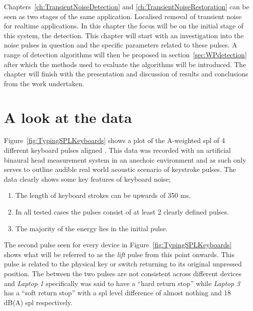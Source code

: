 Chapters~\ref{ch:TransientNoiseDetection} and \ref{ch:TransientNoiseRestoration} can be seen as two stages of the same application. Localised removal of transient noise for realtime applications. In this chapter the focus will be on the initial stage of this system, the detection. This chapter will start with an investigation into the noise pulses in question and the specific parameters related to these pulses. A range of detection algorithms will then be proposed in section~\ref{sec:WPdetection} after which the methods used to evaluate the algorithms will be introduced. The chapter will finish with the presentation and discussion of results and conclusions from the work undertaken.

\section{A look at the data}\label{sec:WPdata}
Figure~\ref{fig:TypingSPLKeyboards} shows a plot of the A-weighted \DIFdelbegin {}\DIFdelend \DIFaddbegin \gls{spl} \DIFaddend of 4 different keyboard pulses aligned \cite{Hauswirth2013}. This data was recorded with an artificial binaural head measurement system in an anechoic environment and as such only serves to outline \DIFaddbegin {}\DIFaddend audible real world acoustic scenario of keystroke pulses. The data clearly shows some key features of keyboard noise;
\begin{enumerate}
\item The length of keyboard strokes can be upwards of 350 ms.
\item In all tested cases the pulses consist of at least 2 clearly defined pulses.
\item The majority of the energy lies in the initial pulse.
\end{enumerate}

The second pulse seen for every device in Figure~\ref{fig:TypingSPLKeyboards} shows what will be referred to as the \emph{lift} pulse from this point onwards. This pulse is related to the physical key or switch returning to its original unpressed position. The \DIFdelbegin {}\DIFdelend \DIFaddbegin {}\DIFaddend between the two pulses are not consistent across different devices and \emph{Laptop 1} specifically was said to have a ``hard return stop'' while \emph{Laptop 3} has a ``soft return stop'' with a \DIFdelbegin {}\DIFdelend \DIFaddbegin \gls{spl} \DIFaddend level difference of almost nothing and 18 dB(A) \DIFdelbegin {}\DIFdelend \DIFaddbegin \gls{spl} \DIFaddend respectively.


